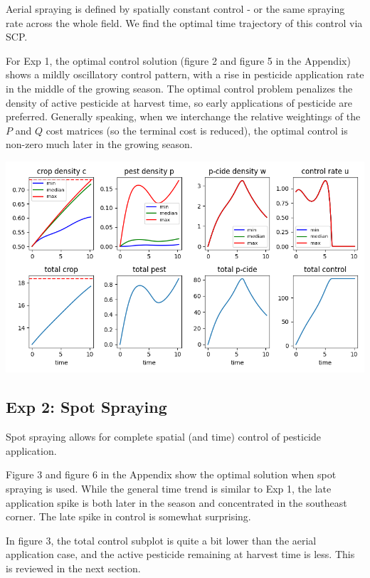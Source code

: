 \documentclass[11pt]{article}
\begin{document}
Aerial spraying is defined by spatially constant control - or the same spraying rate across the whole field. We find the optimal time trajectory of this control via SCP.

For Exp 1, the optimal control solution (figure 2 and  figure 5 in the Appendix) shows a mildly oscillatory control pattern, with a rise in pesticide application rate in the middle of the growing season. The optimal control problem penalizes the density of active pesticide at harvest time, so early applications of pesticide are preferred. Generally speaking, when we interchange the relative weightings of the $P$ and $Q$ cost matrices (so the terminal cost is reduced), the optimal control is non-zero much later in the growing season.

\begin{minipage}{\textwidth}
	\begin{center}
		\includegraphics[width=0.8\linewidth]{../scp_240604-091225/time.png}
	\end{center}
\end{minipage}

\subsection{Exp 2: Spot Spraying}

Spot spraying allows for complete spatial (and time) control of pesticide application.

Figure 3 and figure 6 in the Appendix show the optimal solution when spot spraying is used. While the general time trend is similar to Exp 1, the late application spike is both later in the season and concentrated in the southeast corner. The late spike in control is somewhat surprising.

In figure 3, the total control subplot is quite a bit lower than the aerial application case, and the active pesticide remaining at harvest time is less. This is reviewed in the next section.
\end{document}
